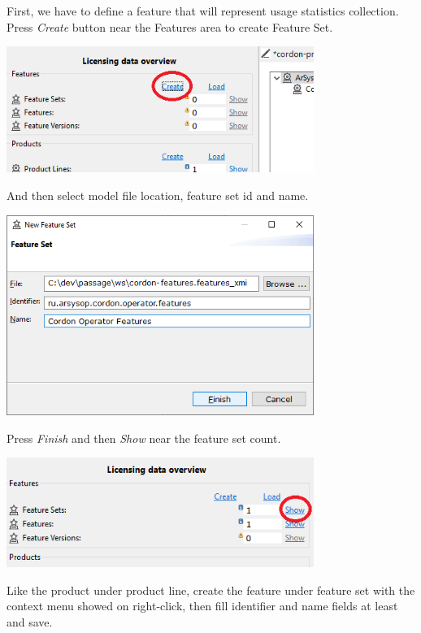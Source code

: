 \documentclass[12pt]{report}
\begin{document}
First, we have to define a feature that will represent usage statistics collection. Press \textit{Create} button near the Features area to create Feature Set.

\begin{center}
    \includegraphics[width=0.75\textwidth]{feature_set_create}
\end{center}

And then select model file location, feature set id and name.

\begin{center}
    \includegraphics[width=0.75\textwidth]{feature_set_dialog}
\end{center}

Press \textit{Finish} and then \textit{Show} near the feature set count.

\begin{center}
    \includegraphics[width=0.75\textwidth]{feature_create}
\end{center}

Like the product under product line, create the feature under feature set with the context menu showed on right-click, then fill identifier and name fields at least and save.
\end{document}
